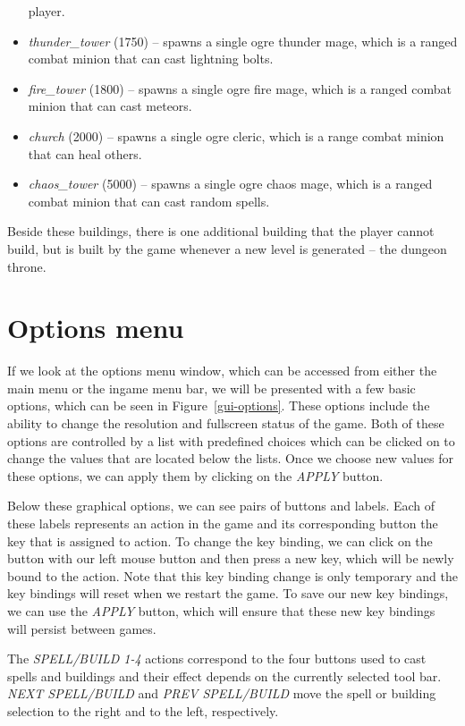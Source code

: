 \begin{itemize}
        player.
    \item \emph{thunder\_tower} (1750) -- spawns a single ogre thunder mage, which is a ranged combat minion that can cast lightning bolts.
    \item \emph{fire\_tower} (1800) -- spawns a single ogre fire mage, which is a ranged combat minion that can cast meteors.
    \item \emph{church} (2000) -- spawns a single ogre cleric, which is a range combat minion that can heal others.
    \item \emph{chaos\_tower} (5000) -- spawns a single ogre chaos mage, which is a ranged combat minion that can cast random spells.
\end{itemize}

Beside these buildings, there is one additional building that the player cannot build, but is built by the game whenever a new level is
generated -- the dungeon throne.

\section{Options menu}

If we look at the options menu window, which can be accessed from either the main menu or the ingame menu bar, we will be presented with a
few basic options, which can be seen in Figure~\ref{gui-options}. These
options include the ability to change the resolution and fullscreen status of the game. Both of these options are controlled by a list
with predefined choices which can be clicked on to change the values that are located below the lists.
Once we choose new values for these options, we can apply them by clicking on the \emph{APPLY} button.

Below these graphical options, we can see pairs of buttons and labels. Each of these labels represents an action in the game and its
corresponding button the key that is assigned to action. To change the key binding, we can click on the button with our left mouse button
and then press a new key, which will be newly bound to the action. Note that this key binding change is only temporary and the key bindings
will reset when we restart the game. To save our new key bindings, we can use the \emph{APPLY} button, which will ensure that these new
key bindings will persist between games.

The \emph{SPELL/BUILD 1-4} actions correspond to the four buttons used to cast spells and buildings and their effect depends on the
currently selected tool bar. \emph{NEXT SPELL/BUILD} and \emph{PREV SPELL/BUILD} move the spell or building selection to the right and
to the left, respectively.


